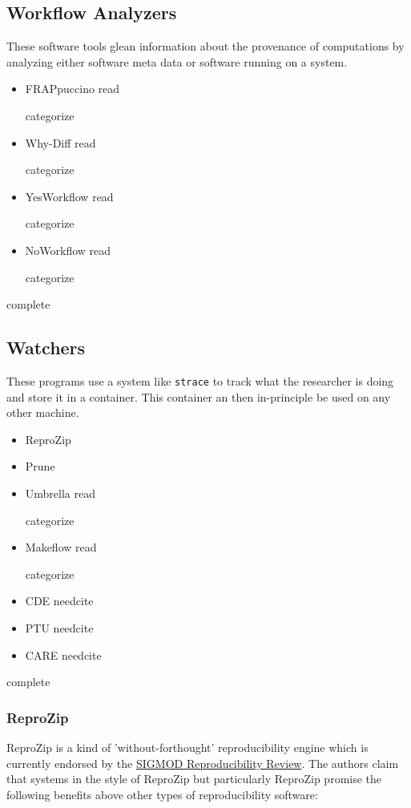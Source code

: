 \documentclass[american]{article}
\newcommand{\Read}{
	\gls{read}
}
\newcommand{\categorize}{
	\gls{categorize}
}
\newcommand{\complete}{
	\gls{complete}
}
\newcommand{\needcite}{
	\gls{needcite}
}
\begin{document}
\subsection{Workflow Analyzers} \label{sec:software-analyzers}

These software tools glean information about the provenance of computations by analyzing either software meta data or software running on a system.

\begin{itemize}
\item FRAPpuccino \cite{FRAPpuccino} \Read \categorize
\item Why-Diff \cite{computational-meta-data} \Read \categorize
\item YesWorkflow \cite{computational-meta-data} \Read \categorize
\item NoWorkflow \cite{computational-meta-data} \Read \categorize
\end{itemize}

\complete

\subsection{Watchers} \label{sec:software-watchers}

These programs use a system like \texttt{strace} to track what the researcher is doing and store it in a container. This container an then in-principle be used on any other machine.

\begin{itemize}
\item ReproZip \cite{reprozip}
\item Prune \cite{Thain-Prune-2016}
\item Umbrella \cite{Thain-Umbrella-2016} \Read \categorize
\item Makeflow \cite{makeflow-2017} \Read \categorize
\item CDE \needcite
\item PTU \needcite
\item CARE \needcite
\end{itemize}

\complete

\subsubsection{ReproZip} \label{sec:reprozip}

ReproZip is a kind of 'without-forthought' reproducibility engine which is currently endorsed by the \href{http://db-reproducibility.seas.harvard.edu/}{SIGMOD Reproducibility Review}. The authors claim that systems in the style of ReproZip but particularly ReproZip promise the following benefits above other types of reproducibility software\cite{reprozip}:
\end{document}
